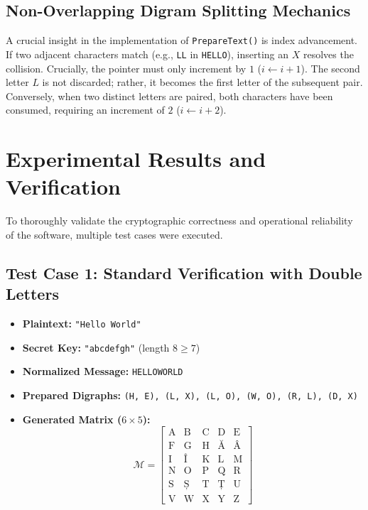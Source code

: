 \documentclass[12pt,a4paper]{article}
\begin{document}
\subsection{Non-Overlapping Digram Splitting Mechanics}
A crucial insight in the implementation of \texttt{PrepareText()} is index advancement. If two adjacent characters match (e.g., \texttt{LL} in \texttt{HELLO}), inserting an $X$ resolves the collision. Crucially, the pointer must only increment by $1$ ($i \leftarrow i + 1$). The second letter $L$ is not discarded; rather, it becomes the first letter of the subsequent pair. Conversely, when two distinct letters are paired, both characters have been consumed, requiring an increment of $2$ ($i \leftarrow i + 2$).

\section{Experimental Results and Verification}

To thoroughly validate the cryptographic correctness and operational reliability of the software, multiple test cases were executed.

\subsection{Test Case 1: Standard Verification with Double Letters}
\begin{itemize}
    \item \textbf{Plaintext:} \texttt{"Hello World"}
    \item \textbf{Secret Key:} \texttt{"abcdefgh"} (length $8 \ge 7$)
    \item \textbf{Normalized Message:} \texttt{HELLOWORLD}
    \item \textbf{Prepared Digraphs:} \texttt{(H, E), (L, X), (L, O), (W, O), (R, L), (D, X)}
    \item \textbf{Generated Matrix ($6 \times 5$):}
    \begin{equation*}
    \mathcal{M} = \begin{bmatrix}
    \text{A} & \text{B} & \text{C} & \text{D} & \text{E} \\
    \text{F} & \text{G} & \text{H} & \text{Ă} & \text{Â} \\
    \text{I} & \text{Î} & \text{K} & \text{L} & \text{M} \\
    \text{N} & \text{O} & \text{P} & \text{Q} & \text{R} \\
    \text{S} & \text{Ș} & \text{T} & \text{Ț} & \text{U} \\
    \text{V} & \text{W} & \text{X} & \text{Y} & \text{Z}
    \end{bmatrix}
    \end{equation*}
\end{itemize}
\end{document}
